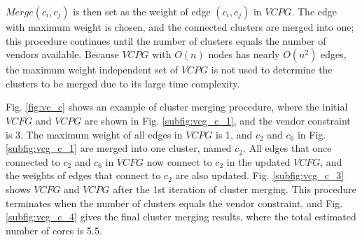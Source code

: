 \documentclass[10pt,journal, compsoc]{IEEEtran}
\begin{document}
$Merge(c_i, c_j)$ is then set as the weight of edge $(c_i, c_j)$ in $VCPG$. The edge with maximum weight is chosen, and the connected clusters are merged into one; this procedure continues until the number of clusters equals the number of vendors available. Because $VCPG$ with $O(n)$ nodes has nearly $O(n^2)$ edges, the maximum weight independent set of $VCPG$ is not used to determine the clusters to be merged due to its large time complexity.



Fig. \ref{fig:vc_c} shows an example of cluster merging procedure, where the initial $VCFG$ and $VCPG$ are shown in Fig. \ref{subfig:vcg_c_1}, and the vendor constraint is 3. The maximum weight of all edges in $VCPG$ is 1, and $c_2$ and $c_6$ in Fig. \ref{subfig:vcg_c_1} are merged into one cluster, named $c_2$. All edges that once connected to $c_2$ and $c_6$ in $VCFG$ now connect to $c_2$ in the updated $VCFG$, and the weights of edges that connect to $c_2$ are also updated. Fig. \ref{subfig:vcg_c_3} shows $VCFG$ and $VCPG$ after the 1st iteration of cluster merging. This procedure terminates when the number of clusters equals the vendor constraint, and Fig. \ref{subfig:vcg_c_4} gives the final cluster merging results, where the total estimated number of cores is 5.5.





\end{document}
